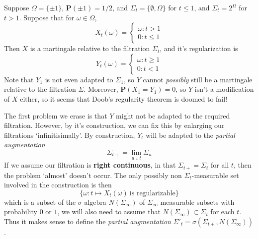 \begin{example}
    Suppose $\Omega = \{ \pm 1 \}$, $\mathbf{P}( \pm 1) = 1/2$, and $\Sigma_t = \{ \emptyset, \Omega \}$ for $t \leq 1$, and $\Sigma_t = 2^\Omega$ for $t > 1$. Suppose that for $\omega \in \Omega$,
    \[ X_t(\omega) = \begin{cases} \omega: t > 1 \\ 0 : t \leq 1 \end{cases} \]
    Then $X$ is a martingale relative to the filtration $\Sigma_t$, and it's regularization is
    \[ Y_t(\omega) = \begin{cases} \omega : t \geq 1 \\ 0 : t < 1 \end{cases} \]
    Note that $Y_1$ is not even adapted to $\Sigma_1$, so $Y$ cannot {\it possibly} still be a martingale relative to the filtration $\Sigma$. Moreover, $\mathbf{P}(X_1 = Y_1) = 0$, so $Y$ isn't a modification of $X$ either, so it seems that Doob's regularity theorem is doomed to fail!
\end{example}

The first problem we erase is that $Y$ might not be adapted to the required filtration. However, by it's construction, we can fix this by enlarging our filtrations `infinitisimally'. By construction, $Y_t$ will be adapted to the {\it partial augmentation}
%
\[ \Sigma_{t+} = \lim_{u \downarrow t} \Sigma_u \]
%
If we assume our filtration is {\bf right continuous}, in that $\Sigma_{t+} = \Sigma_t$ for all $t$, then the problem `almost' doesn't occur. The only possibly non $\Sigma_t$-measurable set involved in the construction is then
%
\[ \{ \omega: t \mapsto X_t(\omega)\ \text{is regularizable} \} \]
%
which is a subset of the $\sigma$ algebra $N(\Sigma_\infty)$ of $\Sigma_\infty$ measurable subsets with probability $0$ or $1$, we will also need to assume that $N(\Sigma_\infty) \subset \Sigma_t$ for each $t$. Thus it makes sense to define the {\it partial augmentation} $\Sigma'_t = \sigma(\Sigma_{t+},N(\Sigma_\infty))$.

